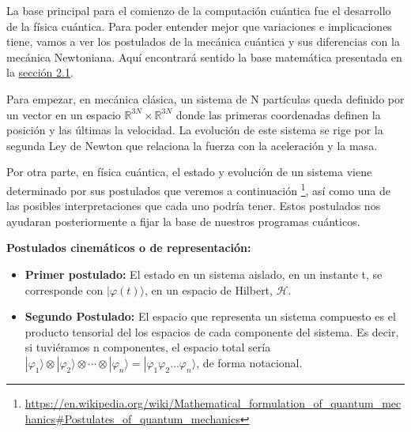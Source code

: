 La base principal para el comienzo de la computación cuántica fue el desarrollo de la física cuántica. Para poder entender mejor que variaciones e implicaciones tiene, vamos a ver los postulados de la mecánica cuántica y sus diferencias con la mecánica Newtoniana. Aquí encontrará sentido la base matemática presentada en la \hyperref[Sec2.1:Matematicas]{sección 2.1}.

\vspace{5pt}

Para empezar, en mecánica clásica, un sistema de N partículas queda definido por un vector en un espacio $\mathbb{R}^{3N} \times \mathbb{R}^{3N}$ donde las primeras coordenadas definen la posición y las últimas la velocidad. La evolución de este sistema se rige por la segunda Ley de Newton que relaciona la fuerza con la aceleración y la masa.

\vspace{5pt}

Por otra parte, en física cuántica, el estado y evolución de un sistema viene determinado por sus postulados\cite{B:Nielsen:2002}\cite{Note:Martin} que veremos a continuación \footnote{\url{https://en.wikipedia.org/wiki/Mathematical_formulation_of_quantum_mechanics\#Postulates_of_quantum_mechanics}}, así como una de las posibles interpretaciones que cada uno podría tener. Estos postulados nos ayudaran posteriormente a fijar la base de nuestros programas cuánticos.
\vspace{10pt}

\textbf{Postulados cinemáticos o de representación:}
\begin{itemize}
    \item \textbf{Primer postulado:}\label{Postulado1} El estado en un sistema aislado, en un instante t, se corresponde con $| \varphi (t) \rangle$, en un espacio de Hilbert, $\mathscr{H}$.
    
    \item \textbf{Segundo Postulado:}\label{Postulado2} El espacio que representa un sistema compuesto es el producto tensorial del los espacios de cada componente del sistema. Es decir, si tuviéramos n componentes, el espacio total sería $|\varphi_{1}\rangle \otimes |\varphi_{2}\rangle \otimes \dotsi \otimes |\varphi_{n}\rangle = |\varphi_{1}\varphi_{2}\dotso \varphi_{n}\rangle$, de forma notacional.
\end{itemize}

